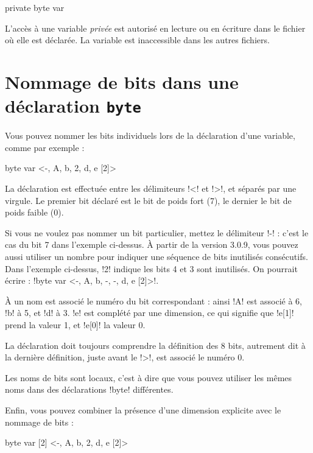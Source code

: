 \begin{piccolo}
private byte var
\end{piccolo}

L'accès à une variable \emph{privée} est autorisé en lecture ou en écriture dans le fichier où elle est déclarée. La variable est inaccessible dans les autres fichiers.




\section{Nommage de bits dans une déclaration \texttt{byte}}

Vous pouvez nommer les bits individuels lors de la déclaration d'une variable, comme par exemple :

\begin{piccolo}
byte var <-, A, b, 2, d, e [2]>
\end{piccolo}

La déclaration est effectuée entre les délimiteurs \pic!<! et \pic!>!, et séparés par une virgule. Le premier bit déclaré est le bit de poids fort (7), le dernier le bit de poids faible (0).

Si vous ne voulez pas nommer un bit particulier, mettez le délimiteur \pic!-! : c'est le cas du bit 7 dans l'exemple ci-dessus. À partir de la version 3.0.9, vous pouvez aussi utiliser un nombre pour indiquer une séquence de bits inutilisés consécutifs. Dans l'exemple ci-dessus, \pic!2! indique les bits 4 et 3 sont inutilisés. On pourrait écrire : \pic!byte var <-, A, b, -, -, d, e [2]>!.


À un nom est associé le numéro du bit correspondant : ainsi \pic!A! est associé à 6, \pic!b! à 5, et \pic!d! à 3. \pic!e! est complété par une dimension, ce qui signifie que \pic!e[1]! prend la valeur 1, et \pic!e[0]! la valeur 0.

La déclaration doit toujours comprendre la définition des 8 bits, autrement dit à la dernière définition, juste avant le \pic!>!, est associé le numéro 0.

Les noms de bits sont locaux, c'est à dire que vous pouvez utiliser les mêmes noms dans des déclarations \pic!byte! différentes.

Enfin, vous pouvez combiner la présence d'une dimension explicite avec le nommage de bits :

\begin{piccolo}
byte var [2] <-, A, b, 2, d, e [2]>
\end{piccolo}

